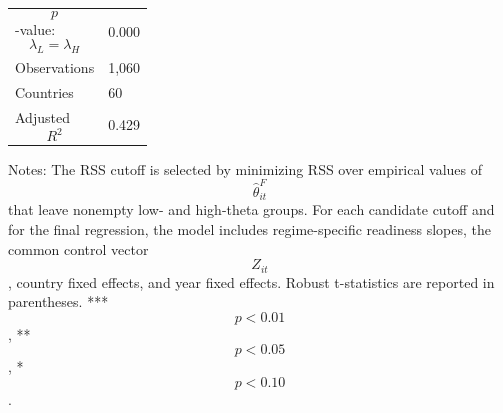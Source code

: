 \begin{table}[H]
\begin{threeparttable}
\begin{tabularx}{\textwidth}{lY}
$$p$$-value: $$\lambda_L=\lambda_H$$ & 0.000 \\
Observations & 1,060 \\
Countries & 60 \\
Adjusted $$R^2$$ & 0.429 \\
\bottomrule
\end{tabularx}
\begin{tablenotes}[flushleft]\footnotesize
\item Notes: The RSS cutoff is selected by minimizing RSS over empirical values of $$\widehat{\theta}^{F}_{it}$$ that leave nonempty low- and high-theta groups. For each candidate cutoff and for the final regression, the model includes regime-specific readiness slopes, the common control vector $$Z_{it}$$, country fixed effects, and year fixed effects. Robust t-statistics are reported in parentheses. *** $$p<0.01$$, ** $$p<0.05$$, * $$p<0.10$$.
\end{tablenotes}
\end{threeparttable}
\end{table}
